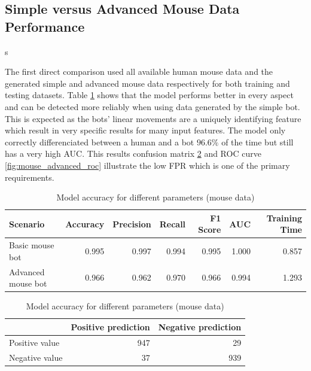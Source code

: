 \documentclass[
    fontsize=12pt,
    headings=small,
    parskip=half,           %
    bibliography=totoc,
    numbers=noenddot,       %
    open=any,               %
    final,                   %
    table
]{scrreprt}
\begin{document}
\subsection{Simple versus Advanced Mouse Data Performance}s

The first direct comparison used all available human mouse data and the generated simple and advanced mouse data respectively for both training and testing datasets. Table \ref{table:simple_vs_advanced_mouse} shows that the model performs better in every aspect and can be detected more reliably when using data generated by the simple bot. This is expected as the bots' linear movements are a uniquely identifying feature which result in very specific results for many input features. The model only correctly differenciated between a human and a bot $96.6\%$ of the time but still has a very high AUC. This results confusion matrix \ref{table:mouse_advanced_confusion} and ROC curve \ref{fig:mouse_advanced_roc} illustrate the low FPR which is one of the primary requirements.

\begin{table}
    \begin{center}
        \begin{tabular}{lrrrrrr}
            \toprule
            Scenario & Accuracy & Precision & Recall & F1 Score & AUC & Training Time \\
            \midrule
            Basic mouse bot & 0.995 & 0.997 & 0.994 & 0.995 & 1.000 & 0.857 \\
            Advanced mouse bot & 0.966 & 0.962 & 0.970 & 0.966 & 0.994 & 1.293 \\
            \bottomrule
        \end{tabular}
    \end{center}
    \caption{Model accuracy for different parameters (mouse data)}
    \label{table:simple_vs_advanced_mouse}
\end{table}

\begin{table}
    \begin{center}
        \begin{tabular}{lrr}
            \toprule
             & Positive prediction & Negative prediction \\
            \midrule
            Positive value & 947 & 29 \\
            Negative value & 37 & 939 \\
            \bottomrule
        \end{tabular}
    \end{center}
    \caption{Model accuracy for different parameters (mouse data)}
    \label{table:mouse_advanced_confusion}
\end{table}
\end{document}

